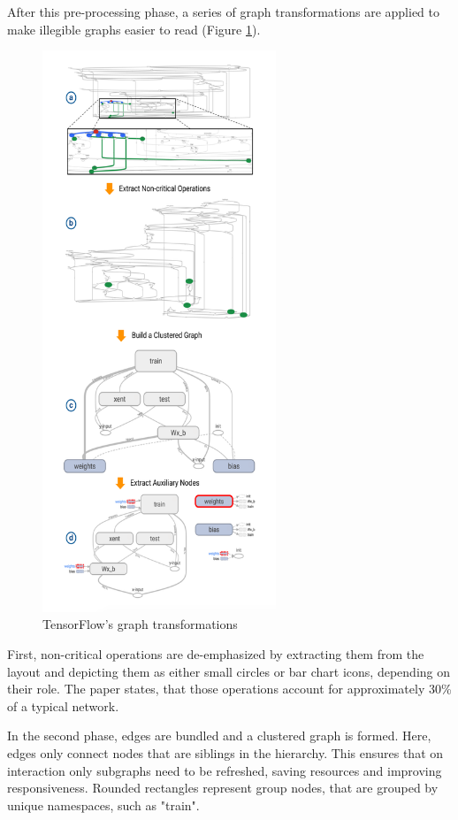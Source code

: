 \documentclass{acmsiggraph}               %
\begin{document}
After this pre-processing phase, a series of graph transformations are applied to make illegible graphs easier to read (Figure \ref{fig:transformations}). \\

\begin{figure}[!htb]
\includegraphics[width=2.75in]{transformations_Wongsuphasawat_et_al}
\caption{TensorFlow's graph transformations \protect\cite{Wongsuphasawat2018}}
\label{fig:transformations}
\end{figure}

First, non-critical operations are de-emphasized by extracting them from the layout and depicting them as either small circles or bar chart icons, depending on their role. The paper states, that those operations account for approximately 30\% of a typical network.

In the second phase, edges are bundled and a clustered graph is formed. Here, edges only connect nodes that are siblings in the hierarchy. This ensures that on interaction only subgraphs need to be refreshed, saving resources and improving responsiveness. Rounded rectangles represent group nodes, that are grouped by unique namespaces, such as "train".
\end{document}
